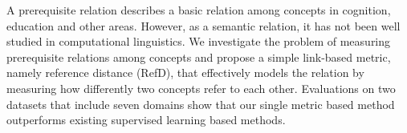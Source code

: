A prerequisite relation describes a basic relation among concepts in cognition, education and other areas. However, as a semantic relation, it has not been well studied in computational linguistics. We investigate the problem of measuring prerequisite relations among concepts and propose a simple link-based metric, namely reference distance (RefD), that effectively models the relation by measuring how differently two concepts refer to each other. Evaluations on two datasets that include seven domains show that our single metric based method outperforms existing supervised learning based methods.
